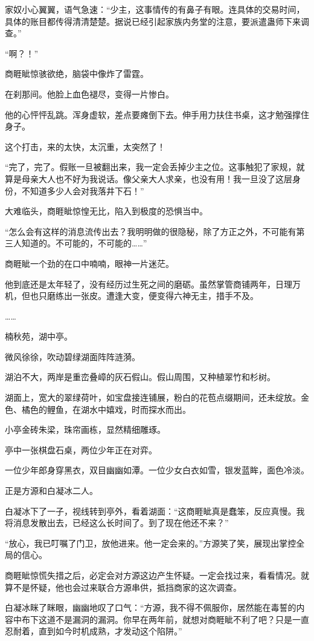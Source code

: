 \begin{this_body}
家奴小心翼翼，语气急速：“少主，这事情传的有鼻子有眼。连具体的交易时间，具体的账目都传得清清楚楚。据说已经引起家族内务堂的注意，要派遣蛊师下来调查。”

“啊？！”

商睚眦惊骇欲绝，脑袋中像炸了雷霆。

在刹那间。他脸上血色褪尽，变得一片惨白。

他的心怦怦乱跳。浑身虚软，差点要瘫倒下去。伸手用力扶住书桌，这才勉强撑住身子。

这个打击，来的太快，太沉重，太突然了！

“完了，完了。假账一旦被翻出来，我一定会丢掉少主之位。这事触犯了家规，就算是母亲大人也不好为我说话。像父亲大人求亲，也没有用！我一旦没了这层身份，不知道多少人会对我落井下石！”

大难临头，商睚眦惊惶无比，陷入到极度的恐惧当中。

“怎么会有这样的消息流传出去？我明明做的很隐秘，除了方正之外，不可能有第三人知道的。不可能的，不可能的……”

商睚眦一个劲的在口中喃喃，眼神一片迷茫。

他到底还是太年轻了，没有经历过生死之间的磨砺。虽然掌管商铺两年，日理万机，但也只磨练出一张皮。遭逢大变，便变得六神无主，措手不及。

……

楠秋苑，湖中亭。

微风徐徐，吹动碧绿湖面阵阵涟漪。

湖泊不大，两岸是重峦叠嶂的灰石假山。假山周围，又种植翠竹和杉树。

湖面上，宽大的翠绿荷叶，如宝盘接连铺展，粉白的花苞点缀期间，还未绽放。金色、橘色的鲤鱼，在湖水中嬉戏，时而探水而出。

小亭金砖朱梁，珠帘画栋，显然精细雕琢。

亭中一张棋盘石桌，两位少年正在对弈。

一位少年郎身穿黑衣，双目幽幽如潭。一位少女白衣如雪，银发蓝眸，面色冷淡。

正是方源和白凝冰二人。

白凝冰下了一子，视线转到亭外，看着湖面：“这商睚眦真是蠢笨，反应真慢。我将消息发散出去，已经这么长时间了。到了现在他还不来？”

“放心，我已叮嘱了门卫，放他进来。他一定会来的。”方源笑了笑，展现出掌控全局的信心。

商睚眦惊慌失措之后，必定会对方源这边产生怀疑。一定会找过来，看看情况。就算不是怀疑，他也会过来联合方源串供，抵挡商家的这次调查。

白凝冰眯了眯眼，幽幽地叹了口气：“方源，我不得不佩服你，居然能在毒誓的内容中布下这道不是漏洞的漏洞。你早在两年前，就想对商睚眦不利了吧？只是一直忍耐着，直到如今时机成熟，才发动这个陷阱。”


\end{this_body}
